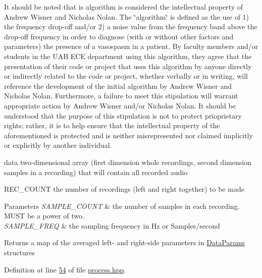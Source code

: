 It should be noted that is algorithm is considered the intellectual property of Andrew Wisner and Nicholas Nolan. The \char`\"{}algorithm\char`\"{} is defined as the use of 1) the frequency drop-\/off and/or 2) a noise value from the frequency band above the drop-\/off frequency in order to diagnose (with or without other factors and parameters) the presence of a vasospasm in a patient. By faculty members and/or students in the U\+A\+B E\+C\+E department using this algorithm, they agree that the presentation of their code or project that uses this algorithm by anyone directly or indirectly related to the code or project, whether verbally or in writing, will reference the development of the initial algorithm by Andrew Wisner and Nicholas Nolan. Furthermore, a failure to meet this stipulation will warrant appropriate action by Andrew Wisner and/or Nicholas Nolan. It should be understood that the purpose of this stipulation is not to protect prioprietary rights; rather, it is to help ensure that the intellectual property of the aforementioned is protected and is neither misrepresented nor claimed implicitly or explicitly by another individual.

data two-\/dimensional array (first dimension whole recordings, second dimension samples in a recording) that will contain all recorded audio

R\+E\+C\+\_\+\+C\+O\+U\+N\+T the number of recordings (left and right together) to be made


\begin{DoxyParams}{Parameters}
{\em S\+A\+M\+P\+L\+E\+\_\+\+C\+O\+U\+N\+T} & the number of samples in each recording. M\+U\+S\+T be a power of two.\\
\hline
{\em S\+A\+M\+P\+L\+E\+\_\+\+F\+R\+E\+Q} & the sampling frequency in Hz or Samples/second\\
\hline
\end{DoxyParams}
\begin{DoxyReturn}{Returns}
a map of the averaged left-\/ and right-\/side parameters in \hyperlink{structDataParams}{Data\+Params} structures 
\end{DoxyReturn}


Definition at line \hyperlink{process_8hpp_source_l00054}{54} of file \hyperlink{process_8hpp_source}{process.\+hpp}.



